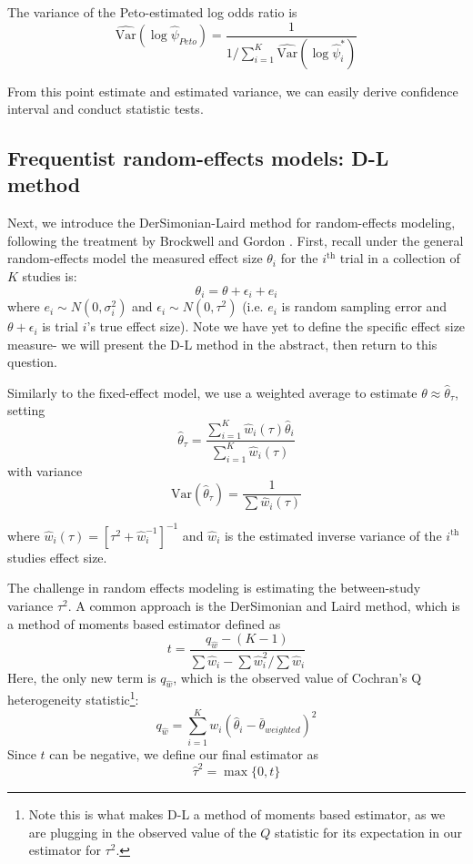 \documentclass[fleqn,10pt]{SelfArx} %
\begin{document}
The variance of the Peto-estimated log odds ratio is
\[\widehat{\textrm{Var}} (\log \hat{\psi}_{Peto}) = \frac{1}{{1}/{\sum_{i = 1}^K \widehat{\textrm{Var}}( \log \hat{\psi}_i^*)}}\]

From this point estimate and estimated variance, we can easily derive confidence interval and conduct statistic tests. 

\subsection*{Frequentist random-effects models: D-L method}

Next, we introduce the DerSimonian-Laird method for random-effects modeling, following the treatment by Brockwell and Gordon \cite{BG}. First, recall under the general random-effects model the measured effect size $\theta_i$ for the $i^{\textrm{th}}$ trial in a collection of $K$ studies is:
\[\theta_i  = \theta + \epsilon_i + e_i\]
where $e_i \sim N(0, \sigma_i^2)$ and $\epsilon_i \sim N(0, \tau^2)$ (i.e. $e_i$ is random sampling error and $\theta + \epsilon_i$ is trial $i$'s true effect size). Note we have yet to define the specific effect size measure- we will present the D-L method in the abstract, then return to this question. 

Similarly to the fixed-effect model, we use a weighted average to estimate $\theta \approx \hat{\theta}_{\tau}$, setting
\[\hat{\theta}_\tau =  \frac{\sum_{i = 1}^K \hat{w}_i(\tau) \hat{\theta}_i }{\sum_{i = 1}^K \hat{w}_i(\tau)}\]
with variance
\[\textrm{Var}(\hat{\theta}_\tau) = \frac{1}{\sum\hat{w}_i(\tau)}\]

where $\hat{w}_i(\tau) = [\tau^2 + \hat{w}_i^{-1}]^{-1}$ and $\hat{w}_i$ is the estimated inverse variance of the $i^{\textrm{th}}$ studies effect size.

The challenge in random effects modeling is estimating the between-study variance $\tau^2$. A common approach is the DerSimonian and Laird method, which is a method of moments based estimator defined as 
\[t = \frac{q_{\hat{w}} - (K - 1)}{\sum \hat{w}_i - \sum \hat{w}_i^2/ \sum \hat{w}_i}\]
Here, the only new term is $q_{\hat{w}}$, which is the observed value of Cochran's Q heterogeneity statistic\footnote{Note this is what makes D-L a method of moments based estimator, as we are plugging in the observed value of the $Q$ statistic for its expectation in our estimator for $\tau^2$.}\cite{HTDA}:
\[q_{\hat{w}} = \sum_{i = 1}^K w_i (\hat{\theta}_i - \bar{\theta}_{weighted})^2\]
Since $t$ can be negative, we define our final estimator as
\[\hat{\tau}^2 = \max \{0, t\}\]
\end{document}
